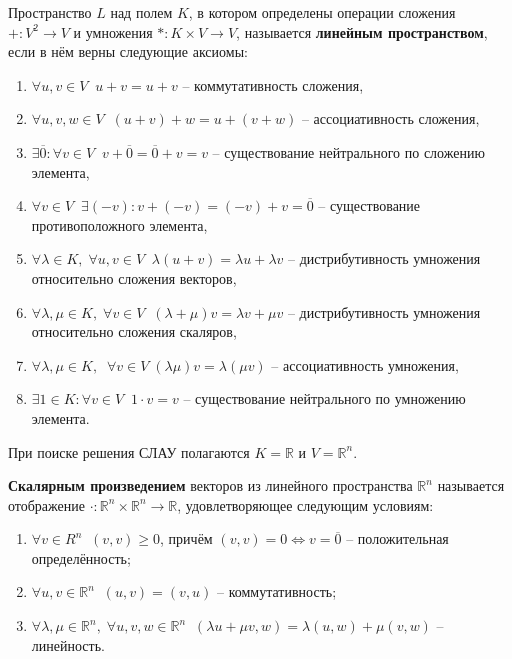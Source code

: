 \documentclass{article}
\begin{document}
\begin{define}
	Пространство $L$ над полем $K$, в котором определены операции сложения
	$+: V^2\rightarrow V$ и умножения $*: K\times V\rightarrow V$,
	называется \textbf{линейным пространством}, если в нём верны следующие
	аксиомы:

	\begin{enumerate}[nosep]
		\item $\forall u,v\in V\;\; u+v=u+v$ -- коммутативность
			сложения,
		\item $\forall u,v,w\in V\;\; (u+v)+w=u+(v+w)$ --
			ассоциативность сложения,
		\item $\exists\overline{0}: \forall v\in V\;\;
			v+\overline{0}=\overline{0}+v=v$ -- существование
			нейтрального по сложению элемента,
		\item $\forall v\in V\;\;\exists (-v): v+(-v)=(-v)+v=
			\overline{0}$ -- существование противоположного
			элемента,
		\item $\forall\lambda\in K,\;\forall u,v\in V\;\; \lambda(u+v)=
			\lambda u+\lambda v$ -- дистрибутивность умножения
			относительно сложения векторов,
		\item $\forall\lambda,\mu\in K,\;\forall v\in V\;\;
			(\lambda+\mu)v=\lambda v+\mu v$ -- дистрибутивность
			умножения относительно сложения скаляров,
		\item $\forall\lambda,\mu\in K,\;\;\forall v\in V\; (\lambda\mu)
			v=\lambda(\mu v)$ -- ассоциативность умножения,
		\item $\exists 1\in K: \forall v\in V\;\; 1\cdot v=v$ --
			существование нейтрального по умножению элемента.
	\end{enumerate}
\end{define}

При поиске решения СЛАУ полагаются $K=\mathbb R$ и $V=\mathbb R^n$.

\begin{define}\label{eq:dot_production}
	\textbf{Скалярным произведением} векторов из линейного пространства
	$\mathbb R^n$ называется отображение $\cdot: \mathbb R^n\times
	\mathbb R^n\rightarrow \mathbb R$, удовлетворяющее следующим условиям:
	\begin{enumerate}[nosep]
		\item $\forall v\in R^n\;\; (v,v)\ge 0$, причём $(v,v)=0
			\Leftrightarrow v=\overline{0}$ -- положительная
			определённость;
		\item $\forall u,v\in \mathbb R^n\;\; (u,v)=(v,u)$ --
			коммутативность;
		\item $\forall \lambda,\mu \in\mathbb R^n,\;
			\forall u,v,w\in \mathbb R^n\;\; (\lambda u+\mu v, w)=
			\lambda(u,w)+\mu(v,w)$ -- линейность.
	\end{enumerate}
\end{define}
\newpage
\end{document}
